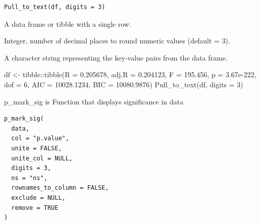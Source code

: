 \documentclass[a4paper]{book}
\begin{document}
%
\begin{Usage}
\begin{verbatim}
Pull_to_text(df, digits = 3)
\end{verbatim}
\end{Usage}
%
\begin{Arguments}
\begin{ldescription}
\item[\code{df}] A data frame or tibble with a single row.

\item[\code{digits}] Integer, number of decimal places to round numeric values (default = 3).
\end{ldescription}
\end{Arguments}
%
\begin{Value}
A character string representing the key-value pairs from the data frame.
\end{Value}
%
\begin{Examples}
\begin{ExampleCode}
df <- tibble::tibble(R = 0.205678, adj.R = 0.204123, F = 195.456, p = 3.67e-222, dof = 6, AIC = 10028.1234, BIC = 10080.9876)
Pull_to_text(df, digits = 3)
\end{ExampleCode}
\end{Examples}
%
\begin{Description}
p\_mark\_sig is Function that displays significance in data
\end{Description}
%
\begin{Usage}
\begin{verbatim}
p_mark_sig(
  data,
  col = "p.value",
  unite = FALSE,
  unite_col = NULL,
  digits = 3,
  ns = "ns",
  rownames_to_column = FALSE,
  exclude = NULL,
  remove = TRUE
)
\end{verbatim}
\end{Usage}
%
\end{document}
